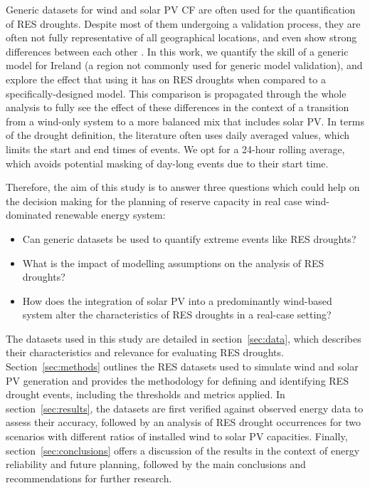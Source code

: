 \documentclass[preprint, 12pt]{elsarticle}
\begin{document}
Generic datasets for wind and solar PV CF are often used for the quantification of RES droughts. Despite most of them undergoing a validation process, they are often not fully representative of all geographical locations, and even show strong differences between each other \citep{kies2021drought}. In this work, we quantify the skill of a generic model for Ireland (a region not commonly used for generic model validation), and explore the effect that using it has on RES droughts when compared to a specifically-designed model. This comparison is propagated through the whole analysis to fully see the effect of these differences in the context of a transition from a wind-only system to a more balanced mix that includes solar PV. In terms of the drought definition, the literature often uses daily averaged values, which limits the start and end times of events. We opt for a 24-hour rolling average, which avoids potential masking of day-long events due to their start time.

Therefore, the aim of this study is to answer three questions which could help on the decision making for the planning of reserve capacity in real case wind-dominated renewable energy system:
\begin{itemize}
	\item Can generic datasets be used to quantify extreme events like RES droughts?
	\item What is the impact of modelling assumptions on the analysis of RES droughts?
	\item How does the integration of solar PV into a predominantly wind-based system alter the characteristics of RES droughts in a real-case setting?
\end{itemize}

The datasets used in this study are detailed in section~\ref{sec:data}, which describes their characteristics and relevance for evaluating RES droughts. Section~\ref{sec:methods} outlines the RES datasets used to simulate wind and solar PV generation and provides the methodology for defining and identifying RES drought events, including the thresholds and metrics applied. In section~\ref{sec:results}, the datasets are first verified against observed energy data to assess their accuracy, followed by an analysis of RES drought occurrences for two scenarios with different ratios of installed wind to solar PV capacities. Finally, section~\ref{sec:conclusions} offers a discussion of the results in the context of energy reliability and future planning, followed by the main conclusions and recommendations for further research.
\end{document}
